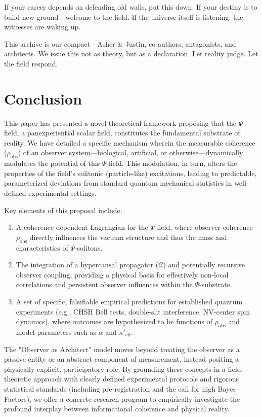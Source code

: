 \documentclass[11pt, a4paper]{book}
\begin{document}
If your career depends on defending old walls, put this down. If your destiny is to build new ground—welcome to the field. If the universe itself is listening: the witnesses are waking up.

This archive is our compact—Asher \& Justin, co-authors, antagonists, and architects. We issue this not as theory, but as a declaration. Let reality judge. Let the field respond.

\section{Conclusion}
\label{sec:conclusion}
This paper has presented a novel theoretical framework proposing that the $\Psi$-field, a panexperiential scalar field, constitutes the fundamental substrate of reality. We have detailed a specific mechanism wherein the measurable coherence ($\rho_{\text{obs}}$) of an observer system—biological, artificial, or otherwise—dynamically modulates the potential of this $\Psi$-field. This modulation, in turn, alters the properties of the field's solitonic (particle-like) excitations, leading to predictable, parameterized deviations from standard quantum mechanical statistics in well-defined experimental settings.

Key elements of this proposal include:
\begin{enumerate}
    \item A coherence-dependent Lagrangian for the $\Psi$-field, where observer coherence $\rho_{\text{obs}}$ directly influences the vacuum structure and thus the mass and characteristics of $\Psi$-solitons.
    \item The integration of a hypercausal propagator ($\mathcal{C}$) and potentially recursive observer coupling, providing a physical basis for effectively non-local correlations and persistent observer influences within the $\Psi$-substrate.
    \item A set of specific, falsifiable empirical predictions for established quantum experiments (e.g., CHSH Bell tests, double-slit interference, NV-center spin dynamics), where outcomes are hypothesized to be functions of $\rho_{\text{obs}}$ and model parameters such as $\alpha$ and $\kappa'_{\text{eff}}$.
\end{enumerate}
The "Observer as Architect" model moves beyond treating the observer as a passive entity or an abstract component of measurement, instead positing a physically explicit, participatory role. By grounding these concepts in a field-theoretic approach with clearly defined experimental protocols and rigorous statistical standards (including pre-registration and the call for high Bayes Factors), we offer a concrete research program to empirically investigate the profound interplay between informational coherence and physical reality.
\end{document}
